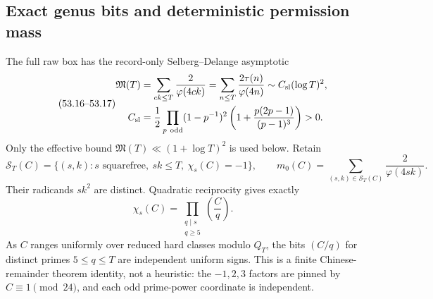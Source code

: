 \documentclass[10pt,reqno]{amsart}
\theoremstyle{definition}
\newcommand{\1}{\mathbf 1}
\begin{document}
\subsection{Exact genus bits and deterministic permission mass}
The full raw box has the record-only Selberg--Delange asymptotic
\begin{equation}\tag{53.16--53.17}
 \begin{aligned}
 \mathfrak M(T)&=\sum_{ck\leq T}\frac2{\varphi(4ck)}
 =\sum_{n\leq T}\frac{2\tau(n)}{\varphi(4n)}
 \sim C_{\rm sl}(\log T)^2,\\
 C_{\rm sl}&=\frac12\prod_{p\ \mathrm{odd}}
 (1-p^{-1})^2\left(1+\frac{p(2p-1)}{(p-1)^3}\right)>0.
 \end{aligned}
\end{equation}
Only the effective bound $\mathfrak M(T)\ll(1+\log T)^2$ is used below.  Retain
\begin{equation}\tag{53.19--53.20}
 \mathcal S_T(C)=\{(s,k):s\text{ squarefree},\ sk\leq T,\ \chi_s(C)=-1\},
 \qquad m_0(C)=\sum_{(s,k)\in\mathcal S_T(C)}\frac2{\varphi(4sk)}.
\end{equation}
Their radicands $sk^2$ are distinct.  Quadratic reciprocity gives exactly
\begin{equation}\tag{53.21}
 \chi_s(C)=\prod_{\substack{q\mid s\\q\geq5}}
                         \left(\frac Cq\right).
\end{equation}
As $C$ ranges uniformly over reduced hard classes modulo $Q_T$, the bits
$(C/q)$ for distinct primes $5\leq q\leq T$ are independent uniform signs.
This is a finite Chinese-remainder theorem identity, not a heuristic: the
$-1,2,3$ factors are pinned by $C\equiv1\pmod {24}$, and each odd
prime-power coordinate is independent.
\end{document}
